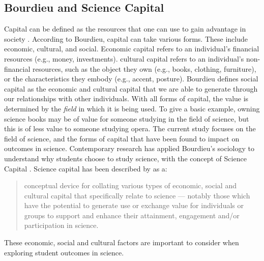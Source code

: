 \subsection*{Bourdieu and Science Capital}
\label{sciencecapital}
Capital can be defined as the resources that one can use to gain advantage in society \cite{Bourdieu_1986}. According to Bourdieu, capital can take various forms. These include economic, cultural, and social. Economic capital refers to an individual's financial resources (e.g., money, investments). cultural capital refers to an individual's non-financial resources, such as the object they own (e.g., books, clothing, furniture), or the characteristics they embody (e.g., accent, posture). Bourdieu defines social capital as the economic and cultural capital that we are able to generate through our relationships with other individuals. With all forms of capital, the value is determined by the \textit{field} in which it is being used. To give a basic example, owning science books may be of value for someone studying in the field of science, but this is of less value to someone studying opera. The current study focuses on the field of science, and the forms of capital that have been found to impact on outcomes in science. Contemporary research has applied Bourdieu's sociology to understand why students choose to study science, with the concept of Science Capital \cite{Archer2015}. Science capital has been described by \cite{Archer2014} as a:
\begin{quote}
conceptual device for collating various types of economic, social and cultural capital that specifically relate to science --- notably those which have the potential to generate use or exchange value for individuals or groups to support and enhance their attainment, engagement and/or participation in science.
\end{quote}
These economic, social and cultural factors are important to consider when exploring student outcomes in science. 

